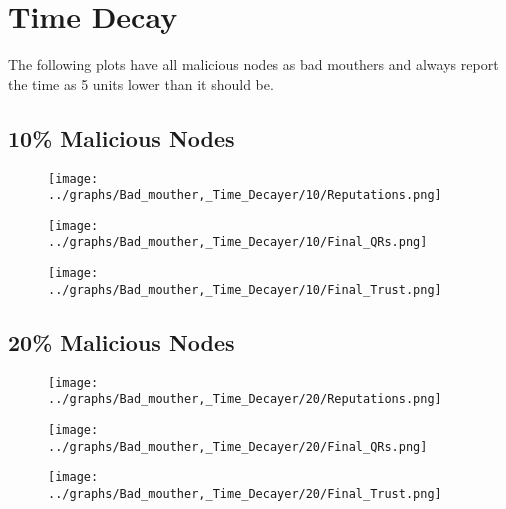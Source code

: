 \documentclass{article}
\begin{document}
    \section*{Time Decay}
    The following plots have all malicious nodes as bad mouthers and always
    report the time as 5 units lower than it should be.
    \\
  \begin{minipage}[t]{0.49\columnwidth}
    \subsection*{10\% Malicious Nodes}
        \begin{figure}[H]
            \centering
            \texttt{[image: ../graphs/Bad\_mouther,\_Time\_Decayer/10/Reputations.png]}
        \end{figure}
        \begin{figure}[H]
            \centering
            \texttt{[image: ../graphs/Bad\_mouther,\_Time\_Decayer/10/Final\_QRs.png]}
        \end{figure}
    \end{minipage}
    \begin{minipage}[t]{0.49\columnwidth}
        \begin{figure}[H]
            \centering
            \texttt{[image: ../graphs/Bad\_mouther,\_Time\_Decayer/10/Final\_Trust.png]}
        \end{figure}
    \end{minipage}

  \begin{minipage}[t]{0.49\columnwidth}
    \subsection*{20\% Malicious Nodes}
        \begin{figure}[H]
            \centering
            \texttt{[image: ../graphs/Bad\_mouther,\_Time\_Decayer/20/Reputations.png]}
        \end{figure}
        \begin{figure}[H]
            \centering
            \texttt{[image: ../graphs/Bad\_mouther,\_Time\_Decayer/20/Final\_QRs.png]}
        \end{figure}
    \end{minipage}
    \begin{minipage}[t]{0.49\columnwidth}
        \begin{figure}[H]
            \centering
            \texttt{[image: ../graphs/Bad\_mouther,\_Time\_Decayer/20/Final\_Trust.png]}
        \end{figure}
    \end{minipage}
\end{document}
